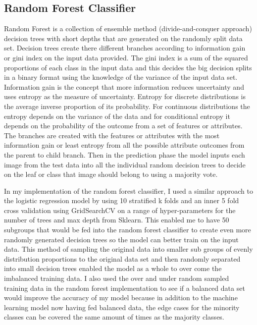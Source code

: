 \documentclass[Dealing with Imbalance in Computer Vision]{IEEEtran}
\begin{document}
\subsection{Random Forest Classifier}
Random Forest is a collection of ensemble method (divide-and-conquer approach) decision trees with short depths that are generated on the randomly split data set. Decision trees create there different branches according to information gain or gini index on the input data provided. The gini index is a sum of the squared proportions of each class in the input data and this decides the big decision splits in a binary format using the knowledge of the variance of the input data set. Information gain is the concept that more information reduces uncertainty and uses entropy as the measure of uncertainty. Entropy for discrete distributions is the average inverse proportion of its probability. For continuous distributions the entropy depends on the variance of the data and for conditional entropy it depends on the probability of the outcome from a set of features or attributes. The branches are created with the features or attributes with the most information gain or least entropy from all the possible attribute outcomes from the parent to child branch. Then in the prediction phase the model inputs each image from the test data into all the individual random decision trees to decide on the leaf or class that image should belong to using a majority vote. 

In my implementation of the random forest classifier, I used a similar approach to the logistic regression model by using 10 stratified k folds and an inner 5 fold cross validation using GridSearchCV on a range of hyper-parameters for the number of trees and max depth from Sklearn. This enabled me to have 50 subgroups that would be fed into the random forest classifier to create even more randomly generated decision trees so the model can better train on the input data. 
This method of sampling the original data into smaller sub groups of evenly distribution proportions to the original data set and then randomly separated into small decision trees enabled the model as a whole to over come the imbalanced training data. I also used the over and under random sampled training data in the random forest implementation to see if a balanced data set would improve the accuracy of my model because in addition to the machine learning model now having fed balanced data, the edge cases for the minority classes can be covered the same amount of times as the majority classes.
\end{document}
